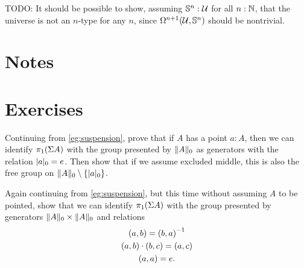 \begin{eg}\label{universe-is-not-truncated}
  TODO: It should be possible to show, assuming $\Sn^n:\UU$ for all $n:\nat$, that the universe \UU is not an $n$-type for any $n$, since $\Omega^{n+1}(\UU,\Sn^n)$ should be nontrivial.
\end{eg}

\section*{Notes}

\section*{Exercises}

\begin{ex}\label{ex:vksusppt}
  Continuing from \autoref{eg:suspension}, prove that if $A$ has a point $a:A$, then we can identify $\pi_1(\susp A)$ with the group presented by $\trunc0A$ as generators with the relation $\tproj0a = e$.
  Then show that if we assume excluded middle, this is also the free group on $\trunc0 A \setminus \{\tproj0 a \}$.
\end{ex}

\begin{ex}\label{ex:vksuspnopt}
  Again continuing from \autoref{eg:suspension}, but this time without assuming $A$ to be pointed, show that we can identify $\pi_1(\susp A)$ with the group presented by generators $\trunc0A \times \trunc0A$ and relations
  \begin{gather*}
    (a,b)=\opp{(b,a)}\\
    (a,b)\cdot (b,c) = (a,c)\\
    (a,a)=e.
  \end{gather*}
\end{ex}

